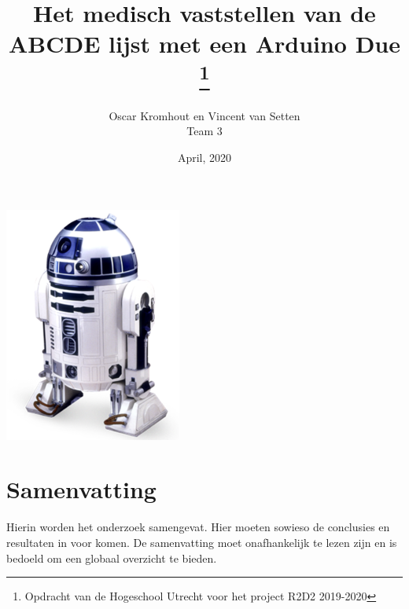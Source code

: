 \documentclass{article}
\title{Het medisch vaststellen van de ABCDE lijst met een Arduino Due \thanks{Opdracht van de Hogeschool Utrecht voor het project R2D2 2019-2020}}
\author{Oscar Kromhout en Vincent van Setten\\ Team 3}
\date{April, 2020}
\begin{document}
\begin{titlepage}
	\centering
	\maketitle
	\includegraphics[scale=2.0]{title.png}
	\clearpage
\end{titlepage}

\tableofcontents
\clearpage 
\section{Samenvatting}
Hierin worden het onderzoek samengevat. Hier moeten sowieso de conclusies en resultaten in voor komen. De samenvatting moet onafhankelijk te lezen zijn en is bedoeld om een globaal overzicht te bieden.
	
\end{document}
